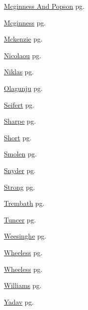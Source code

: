 \item \hyperlink{Mcginness And Popson.1}{Mcginness And Popson} pg. \pageref{abs:Mcginness And Popson}
\item \hyperlink{Mcginness.1}{Mcginness} pg. \pageref{abs:Mcginness}
\item \hyperlink{Mckenzie.1}{Mckenzie} pg. \pageref{abs:Mckenzie}
\item \hyperlink{Nicolaou.1}{Nicolaou} pg. \pageref{abs:Nicolaou}
\item \hyperlink{Niklas.1}{Niklas} pg. \pageref{abs:Niklas}
\item \hyperlink{Olagunju.1}{Olagunju} pg. \pageref{abs:Olagunju}
\item \hyperlink{Seifert.1}{Seifert} pg. \pageref{abs:Seifert}
\item \hyperlink{Sharpe.1}{Sharpe} pg. \pageref{abs:Sharpe}
\item \hyperlink{Short.1}{Short} pg. \pageref{abs:Short}
\item \hyperlink{Smolen.1}{Smolen} pg. \pageref{abs:Smolen}
\item \hyperlink{Snyder.1}{Snyder} pg. \pageref{abs:Snyder}
\item \hyperlink{Strong.1}{Strong} pg. \pageref{abs:Strong}
\item \hyperlink{Trembath.1}{Trembath} pg. \pageref{abs:Trembath}
\item \hyperlink{Tuncer.1}{Tuncer} pg. \pageref{abs:Tuncer}
\item \hyperlink{Weesinghe.1}{Weesinghe} pg. \pageref{abs:Weesinghe}
\item \hyperlink{Wheeless.1}{Wheeless} pg. \pageref{abs:Wheeless}
\item \hyperlink{Wheeless.1}{Wheeless} pg. \pageref{abs:Wheeless}
\item \hyperlink{Williams.1}{Williams} pg. \pageref{abs:Williams}
\item \hyperlink{Yadav.1}{Yadav} pg. \pageref{abs:Yadav}
